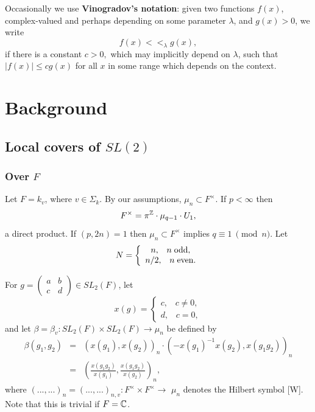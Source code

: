 Occasionally we use {\bf Vinogradov's notation}: given two functions $f(x)$,
complex-valued and perhaps depending on some parameter $\lambda $, and $%
g(x)>0$, we write 
\[
f(x)<<_\lambda g(x), 
\]
if there is a constant $c>0,$ which may implicitly depend on $\lambda $,
such that $|f(x)|\leq cg(x)$ for all $x$ in some range which depends on the
context.

\section{Background}

\subsection{Local covers of $SL(2)$}

\subsubsection{Over $F$}

Let $F=k_v$, where $v\in \Sigma _k$. By our assumptions, $\mu _n\subset
F^{\times }$. If $p<\infty $ then 
\[
F^{\times }=\pi ^{{\Bbb Z}}\cdot \mu _{q-1}\cdot U_1, 
\]
a direct product. If $(p,2n)=1$ then $\mu _n\subset F^{\times }$ implies $%
q\equiv 1\ \pmod{n}$. Let 
\begin{equation}
N=\left\{ 
\begin{array}{c}
n,\;\;\;n\;{\rm odd}, \\ 
n/2,\;\;\;n\;{\rm even}.
\end{array}
\right.
\end{equation}

For $g=\left( 
\begin{array}{cc}
a & b \\ 
c & d
\end{array}
\right) \in SL_2(F)$, let 
\[
x(g)=\left\{ 
\begin{array}{c}
c,\;\;\;c\neq 0, \\ 
d,\;\;\;c=0,
\end{array}
\right. 
\]
and let $\beta =\beta _v:SL_2(F)\times SL_2(F)\rightarrow \mu _n$ be defined
by 
\begin{eqnarray}
\beta (g_1,g_2) &=&(x(g_1),x(g_2))_n\cdot (-x(g_1)^{-1}x(g_2),x(g_1g_2))_n \\
&=&(\frac{x(g_1g_2)}{x(g_1)},\frac{x(g_1g_2)}{x(g_2)})_n,  \nonumber
\end{eqnarray}
where $(...,...)_n=(...,...)_{n,v}:F^{\times }\times F^{\times }\rightarrow $
$\mu _n$ denotes the Hilbert symbol [W]. Note that this is trivial if $F=%
{\Bbb {C}}$.

